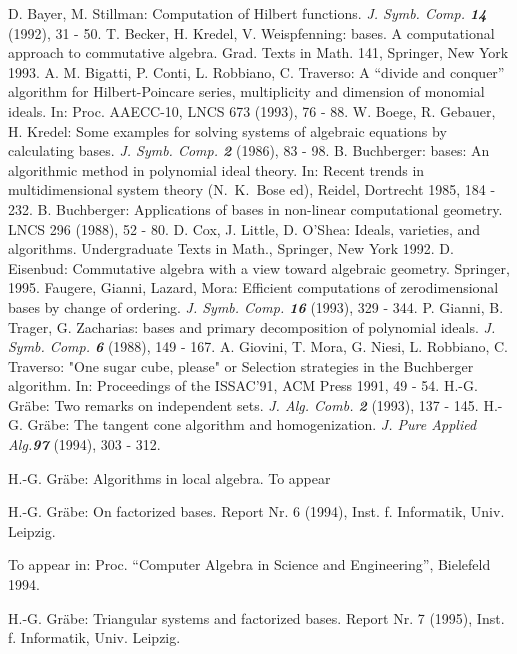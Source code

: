 \pagebreak

\begin{thebibliography}{xxx}
 D. Bayer, M. Stillman: Computation of Hilbert
functions. {\it J. Symb. Comp. \bf 14} (1992), 31 - 50.
 T. Becker, H. Kredel, V. Weispfenning: \gr bases. A
computational approach to commutative algebra. Grad. Texts in Math.
141, Springer, New York 1993.
 A. M. Bigatti, P. Conti, L. Robbiano, C. Traverso: A
``divide and conquer'' algorithm for Hilbert-Poincare series,
multiplicity and dimension of monomial ideals. In: Proc. AAECC-10,
LNCS 673 (1993), 76 - 88.
 W. Boege, R. Gebauer, H. Kredel: Some examples for
solving systems of algebraic equations by calculating \gr bases. {\it
J. Symb. Comp. \bf 2} (1986), 83 - 98.
 B. Buchberger: \gr bases: An algorithmic method in
polynomial ideal theory. In: Recent trends in multidimensional
system theory (N.~K.~Bose ed), Reidel, Dortrecht 1985, 184 - 232.
 B. Buchberger: Applications of \gr bases in non-linear
computational geometry. LNCS 296 (1988), 52 - 80.
 D. Cox, J. Little, D. O'Shea: Ideals, varieties, and
algorithms.  Undergraduate Texts in Math., Springer, New York 1992.
 D. Eisenbud: Commutative algebra with a view toward
algebraic geometry. Springer, 1995.
 Faugere, Gianni, Lazard, Mora: Efficient computations
of zerodimensional \gr bases by change of ordering. {\it
J. Symb. Comp. \bf 16} (1993), 329 - 344.
 P. Gianni, B. Trager, G. Zacharias: \gr bases and
primary decomposition of polynomial ideals. {\it J. Symb. Comp. \bf
6} (1988), 149 - 167.
 A. Giovini, T. Mora, G. Niesi, L. Robbiano, C.
Traverso: "One sugar cube, please" or Selection strategies in the
Buchberger algorithm. In: Proceedings of the ISSAC'91, ACM Press
1991, 49 - 54.
 H.-G. Gr\"abe: Two remarks on independent sets.
{\it J. Alg. Comb. \bf 2} (1993), 137 - 145.
 H.-G. Gr\"abe: The tangent cone algorithm and
homogenization. {\it J. Pure Applied Alg.\bf 97} (1994), 303 - 312.

 H.-G. Gr\"abe: Algorithms in local algebra. To appear

 H.-G. Gr\"abe: On factorized \gr bases. Report Nr. 6
(1994), Inst. f. Informatik, Univ. Leipzig.

To appear in: Proc. ``Computer Algebra in Science and Engineering'',
Bielefeld 1994.

 H.-G. Gr\"abe: Triangular systems and factorized \gr
bases. Report Nr. 7 (1995), Inst. f. Informatik, Univ. Leipzig.


\end{thebibliography}
